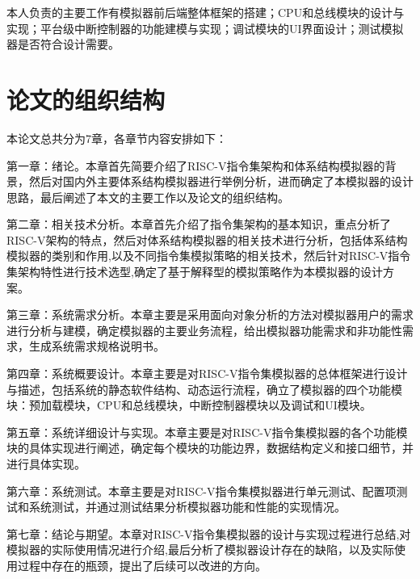 本人负责的主要工作有模拟器前后端整体框架的搭建；CPU和总线模块的设计与实现；平台级中断控制器的功能建模与实现；调试模块的UI界面设计；测试模拟器是否符合设计需要。


\section{论文的组织结构}
本论文总共分为7章，各章节内容安排如下：


第一章：绪论。本章首先简要介绍了RISC-V指令集架构和体系结构模拟器的背景，然后对国内外主要体系结构模拟器进行举例分析，进而确定了本模拟器的设计思路，最后阐述了本文的主要工作以及论文的组织结构。


第二章：相关技术分析。本章首先介绍了指令集架构的基本知识，重点分析了RISC-V架构的特点，然后对体系结构模拟器的相关技术进行分析，包括体系结构模拟器的类别和作用,以及不同指令集模拟策略的相关技术，然后针对RISC-V指令集架构特性进行技术选型,确定了基于解释型的模拟策略作为本模拟器的设计方案。


第三章：系统需求分析。本章主要是采用面向对象分析的方法对模拟器用户的需求进行分析与建模，确定模拟器的主要业务流程，给出模拟器功能需求和非功能性需求，生成系统需求规格说明书。


第四章：系统概要设计。本章主要是对RISC-V指令集模拟器的总体框架进行设计与描述，包括系统的静态软件结构、动态运行流程，确立了模拟器的四个功能模块：预加载模块，CPU和总线模块，中断控制器模块以及调试和UI模块。


第五章：系统详细设计与实现。本章主要是对RISC-V指令集模拟器的各个功能模块的具体实现进行阐述，确定每个模块的功能边界，数据结构定义和接口细节，并进行具体实现。


第六章：系统测试。本章主要是对RISC-V指令集模拟器进行单元测试、配置项测试和系统测试，并通过测试结果分析模拟器功能和性能的实现情况。


第七章：结论与期望。本章对RISC-V指令集模拟器的设计与实现过程进行总结,对模拟器的实际使用情况进行介绍,最后分析了模拟器设计存在的缺陷，以及实际使用过程中存在的瓶颈，提出了后续可以改进的方向。


